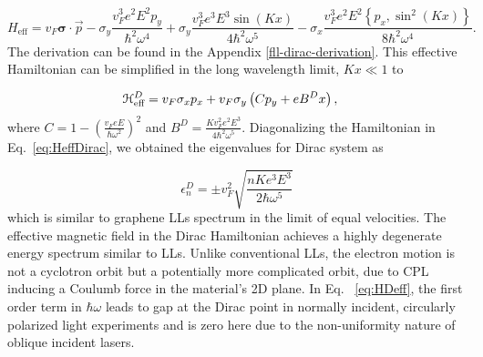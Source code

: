 \begin{equation} \label{eq:HDeff}
  H_{\text{eff}}= v_{F}\bm{\sigma}\cdot\vec{p}-\sigma_y\frac{v_F^3 e^2 E^2 p_y}{\hbar^{2}\omega^{4}}
  +\sigma_y\frac{v_F^3 e^3 E^{3}\sin{(Kx)}}{4\hbar^{2}\omega^{5}}
  -\sigma_x\frac{v_F^3 e^2 E^2 \left\{p_x, \sin^2{(Kx)} \right\} }{8\hbar^{2}\omega^{4}}.
\end{equation}
The derivation can be found in the Appendix \ref{fll-dirac-derivation}.
This effective Hamiltonian can be simplified in the long wavelength limit, $Kx \ll 1$ to

\begin{align} \label{eq:HeffDirac}
  \mathcal{H}_{\text{eff}}^D &= v_{F}\sigma_{x}p_{x}+v_F\sigma_{y} \left( C p_{y} + eB^Dx \right),
\end{align}%
where $C = 1-\left(\tfrac{v_{F}eE}{\hbar\omega^2}\right)^2$ and $B^D=\frac{Kv_F^2 e^2E^3}{4\hbar^{2}\omega^{5}}$.
Diagonalizing the Hamiltonian in Eq.~\eqref{eq:HeffDirac}, we obtained the eigenvalues for Dirac system as%

\begin{equation} \label{eq:DiracEner}
  \epsilon_{n}^D = \pm v_F^2 \sqrt{\dfrac{nK e^3 E^3}{2 \hbar \omega^5}}
\end{equation}
which is similar to graphene LLs spectrum in the limit of equal velocities.
The effective magnetic field in the Dirac Hamiltonian achieves a highly degenerate energy spectrum similar to LLs.
Unlike conventional LLs, the electron motion is not a cyclotron orbit but a potentially more complicated orbit, due to CPL inducing a Coulumb force in the material's 2D plane.
In Eq. ~\eqref{eq:HDeff}, the first order term in $\hbar \omega$ leads to gap at the Dirac point in normally incident, circularly polarized light experiments \cite{YHW, JWM} and is zero here due to the non-uniformity nature of oblique incident lasers.


